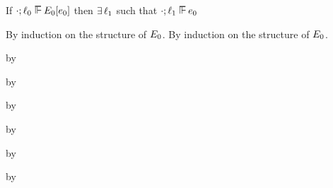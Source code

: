 \begin{lemma}\label{H-labeled-hole}
  If\/ $\snil; \sowner_0 \sWSOP \ctx_0[\sexpr_0]$
  then\/ $\exists\,\ell_1$
  such that\/ $\snil; \sowner_1 \sWSOP \sexpr_0$
\end{lemma}{
\newcommand{\shortproof}{By induction on the structure of $\ctx_0$.}
\begin{lamportproof*}
  \shortproof
\mainproof
  \shortproof

    \begin{pfproof}
      \qedstep
    \end{pfproof}

    \begin{pfproof}
      \qedstep
        \begin{pfproof}
          by \pfih
        \end{pfproof}
    \end{pfproof}

    \begin{pfproof}
      \qedstep
        \begin{pfproof}
          by \pfih
        \end{pfproof}
    \end{pfproof}

    \begin{pfproof}
      \qedstep
        \begin{pfproof}
          by \pfih
        \end{pfproof}
    \end{pfproof}

    \begin{pfproof}
      \qedstep
        \begin{pfproof}
          by \pfih
        \end{pfproof}
    \end{pfproof}

    \begin{pfproof}
      \qedstep
        \begin{pfproof}
          by \pfih
        \end{pfproof}
    \end{pfproof}

    \begin{pfproof}
      \qedstep
        \begin{pfproof}
          by \pfih
        \end{pfproof}
    \end{pfproof}


\end{lamportproof*}}
